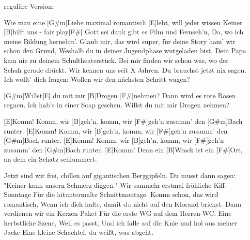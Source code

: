 
{\footnotesize reguläre Version:}\hspace{8.5em}{\footnotesize Stromausfall-Version:}

\hspace{1em}



\begin{guitar}
	
	Wie man eine [G#m]Liebe maximal romantisch [E]lebt, will jeder wissen
	Keiner [B]hilft uns - fair play[F#]{ }
	Gott sei dank gibt es Film und Fernseh'n,
	Da, wo ich meine Bildung hernehm'.
	Glaub mir, das wird super, für deine Story ham' wir schon den Grund,
	Weshalb du in deiner Jugendphase wutgeladen bist.
	Dein Papa kam nie zu deinem Schultheaterstück.
	Bei mir finden wir schon was, wo der Schuh gerade drückt.
	Wir kennen uns seit X Jahren.
	Du brauchst jetzt nix sagen.
	Ich wollt' dich fragen:
	Wollen wir den nächsten Schritt wagen?
	
	[G#m]Willst[E] du mit mir [B]Drogen [F#]nehmen?
	Dann wird es rote Rosen regnen.
	Ich hab’s in einer Soap gesehen.
	Willst du mit mir Drogen nehmen?
	
	[E]Komm! Komm, wir [B]geh'n, komm, wir [F#]geh'n zusamm' den [G#m]Bach runter.
	[E]Komm! Komm, wir [B]geh'n, komm, wir [F#]geh'n zusamm' den [G#m]Bach runter.
	[E]Komm! Komm, wir [B]geh'n, komm, wir [F#]geh'n zusamm' den [G#m]Bach runter.
	[E]Komm! Denn ein [B]Wrack ist ein [F#]Ort, an dem ein Schatz schlummert.
	
	\pagebreak
	
	Jetzt sind wir frei, chillen auf gigantischen Berggipfeln.
	Du musst dann sagen: "Keiner kann unsern Schmerz diggen."
	Wir sammeln erstmal fröhliche Kiff-Sonntage
	Für die hituntermalte Schnittmontage.
	Komm schon, das wird romantisch,
	Wenn ich dich halte, damit du nicht auf den Klorand brichst.
	Dann verdienen wir ein Kerzen-Paket
	Für die erste WG auf dem Herren-WC.
	Eine herbstliche Szene,
	Weil es passt,
	Und ich falle auf die Knie und hol aus meiner Jacke
	Eine kleine Schachtel, du weißt, was abgeht.
	
	 
	

\end{guitar}
